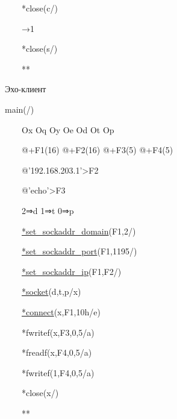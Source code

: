 \documentclass[12t,english,russian]{article}
\begin{document}
\ \ \ \ *close(c/)

\ \ \ \ →1

\ \ \ \ *close(s/)

\ \ \ \ **

\begin{center}
\textcolor[rgb]{1,0,0}{Эхо-клиент}
\end{center}
main(/)

\ \ \ \ Ox Oq Oy Oe Od Ot Op

\ \ \ \ @+F1(16) @+F2(16) @+F3(5) @+F4(5)

\ \ \ \ @'192.168.203.1'>F2

\ \ \ \ @'echo\n'>F3

\ \ \ \ 2⇒d 1⇒t 0⇒p

\ \ \ \ \hyperref[set_sockaddr_domain]{*set\_sockaddr\_domain}(F1,2/)

\ \ \ \ \hyperref[set_sockaddr_port]{*set\_sockaddr\_port}(F1,1195/)

\ \ \ \ \hyperref[set_sockaddr_ip]{*set\_sockaddr\_ip}(F1,F2/)

\ \ \ \ \hyperref[socket]{*socket}(d,t,p/x)

\ \ \ \ \hyperref[connect]{*connect}(x,F1,10h/e)

\ \ \ \ *fwritef(x,F3,0,5/a)

\ \ \ \ *freadf(x,F4,0,5/a)

\ \ \ \ *fwritef(1,F4,0,5/a)

\ \ \ \ *close(x/)

\ \ \ \ **
\end{document}
